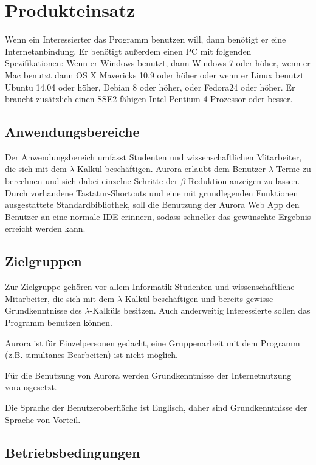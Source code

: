 \documentclass[parskip=full,11pt,twoside]{scrartcl}
\begin{document}
\newpage
\section{Produkteinsatz}

Wenn ein Interessierter das Programm benutzen will, dann benötigt er eine Internetanbindung. Er benötigt außerdem einen PC mit folgenden Spezifikationen: Wenn er Windows benutzt, dann Windows 7 oder höher, wenn er Mac benutzt dann OS X Mavericks 10.9 oder höher oder wenn er Linux benutzt Ubuntu 14.04 oder höher, Debian 8 oder höher, oder Fedora24 oder höher.
Er braucht zusätzlich einen SSE2-fähigen Intel Pentium 4-Prozessor oder besser.

\subsection{Anwendungsbereiche}

Der Anwendungsbereich umfasst Studenten und wissenschaftlichen Mitarbeiter, die sich mit dem $\lambda$-Kalkül beschäftigen. Aurora erlaubt dem Benutzer $\lambda$-Terme zu berechnen und sich dabei einzelne Schritte der $\beta$-Reduktion anzeigen zu lassen. Durch vorhandene Tastatur-Shortcuts und eine mit grundlegenden Funktionen ausgestattete Standardbibliothek, soll die Benutzung der Aurora Web App den Benutzer an eine normale IDE erinnern, sodass schneller das gewünschte Ergebnis erreicht werden kann.

\subsection{Zielgruppen}

Zur Zielgruppe gehören vor allem Informatik-Studenten und wissenschaftliche Mitarbeiter, die sich mit dem $\lambda$-Kalkül beschäftigen und bereits gewisse Grundkenntnisse des $\lambda$-Kalküls besitzen. Auch anderweitig Interessierte sollen das Programm benutzen können.

Aurora ist für Einzelpersonen gedacht, eine Gruppenarbeit mit dem Programm (z.B. simultanes Bearbeiten) ist nicht möglich.

Für die Benutzung von Aurora werden Grundkenntnisse der Internetnutzung vorausgesetzt.

Die Sprache der Benutzeroberfläche ist Englisch, daher sind Grundkenntnisse der Sprache von Vorteil.

\subsection{Betriebsbedingungen}
\end{document}
